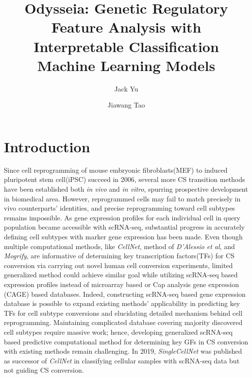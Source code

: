 \documentclass[fleqn,10pt]{wlscirep}
\title{Odysseia: Genetic Regulatory Feature Analysis with Interpretable Classification Machine Learning Models}
\author[1,*1]{Jack Yu}
\author[1,]{Jiawang Tao}
\affil[1]{Affiliation, department, city, postcode, country}
\affil[*1]{Correspondence: gyu17@alumni.jh.edu}
\begin{document}
\flushbottom
\maketitle
%
%
\thispagestyle{empty}
\section*{Introduction}
Since cell reprogramming of mouse embryonic fibroblasts(MEF) to induced pluripotent stem cell(iPSC) succeed in 2006\cite{yamanaka_2006}, several more CS transition methods have been established both \emph{in vivo} and \emph{in vitro}\cite{fibroblast_sertoli_2012,fibro_cardio_2012,mef_hept_2011}, spurring prospective development in biomedical area.
However, reprogrammed cells may fail to match precisely in vivo counterparts' identities\cite{ASCL1_dopaminergic_neuron_2021}, and precise reprogramming toward cell subtypes remains impossible\cite{cell_repro_review}.
As gene expression profiles for each individual cell in query population became accessible with scRNA-seq, substantial progress in accurately defining cell subtypes with marker gene expression has been made\cite{pancreas_subtypes_2016,lung_subtypes_2014}.
Even though multiple computational methods, like \emph{CellNet}\cite{cellnet_2014}, method of \emph{D’Alessio et al}\cite{dalessio_2015}, and \emph{Mogrify}\cite{mogrify_2016}, are informative of determining key transcription factors(TFs) for CS conversion via carrying out novel human cell conversion experiments, limited generalized method could achieve similar goal while utilizing scRNA-seq based expression profiles instead of microarray based or Cap analysis gene expression (CAGE) based databases.
Indeed, constructing scRNA-seq based gene expression database is possible to expand existing methods' applicability in predicting key TFs for cell subtype conversions and elucidating detailed mechanism behind cell reprogramming.
Maintaining complicated database covering majority discovered cell subtypes require massive work; hence, developing generalized scRNA-seq based predictive computational method for determining key GFs in CS conversion with existing methods remain challenging.
In 2019, \emph{SingleCellNet}\cite{scn_2019} was published as successor of \emph{CellNet} in classifying cellular samples with scRNA-seq data but not guiding CS conversion.
\end{document}
